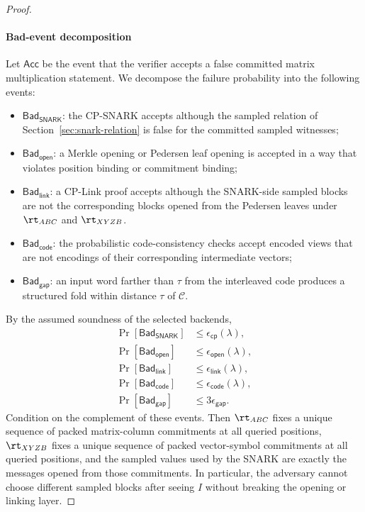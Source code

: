 \begin{proof}
\paragraph{Bad-event decomposition}
Let \(\mathsf{Acc}\) be the event that the verifier accepts a false committed
matrix multiplication statement.  We decompose the failure probability into
the following events:
\begin{itemize}
  \item \(\mathsf{Bad}_{\mathsf{SNARK}}\): the CP-SNARK accepts although the
  sampled relation of Section~\ref{sec:snark-relation} is false for the
  committed sampled witnesses;
  \item \(\mathsf{Bad}_{\mathsf{open}}\): a Merkle opening or Pedersen leaf
  opening is accepted in a way that violates position binding or commitment
  binding;
	  \item \(\mathsf{Bad}_{\mathsf{link}}\): a CP-Link proof accepts although the
	  SNARK-side sampled blocks are not the corresponding blocks opened from the
	  Pedersen leaves under \(\rt_{ABC}\) and \(\rt_{XYZB}\).
  \item \(\mathsf{Bad}_{\mathsf{code}}\): the probabilistic code-consistency
  checks accept encoded views that are not encodings of their corresponding
  intermediate vectors;
  \item \(\mathsf{Bad}_{\mathsf{gap}}\): an input word farther than
  \(\tau\) from the interleaved code produces a structured fold within
  distance \(\tau\) of \(\mathcal{C}\).
\end{itemize}
By the assumed soundness of the selected backends,
\[
\begin{aligned}
\Pr[\mathsf{Bad}_{\mathsf{SNARK}}]
  &\le \epsilon_{\mathsf{cp}}(\lambda),\\
\Pr[\mathsf{Bad}_{\mathsf{open}}]
  &\le \epsilon_{\mathsf{open}}(\lambda),\\
\Pr[\mathsf{Bad}_{\mathsf{link}}]
  &\le \epsilon_{\mathsf{link}}(\lambda),\\
\Pr[\mathsf{Bad}_{\mathsf{code}}]
  &\le \epsilon_{\mathsf{code}}(\lambda),\\
\Pr[\mathsf{Bad}_{\mathsf{gap}}]
  &\le 3\epsilon_{\mathsf{gap}}.
\end{aligned}
\]
Condition on the complement of these events.  Then \(\rt_{ABC}\) fixes a
unique sequence of packed matrix-column commitments at all queried positions,
\(\rt_{XYZB}\) fixes a unique sequence of packed vector-symbol commitments at
all queried positions, and the sampled values used by the SNARK are exactly the
messages opened from those commitments.  In particular, the adversary cannot
choose different sampled blocks after seeing \(I\) without breaking the
opening or linking layer.


\end{proof}
